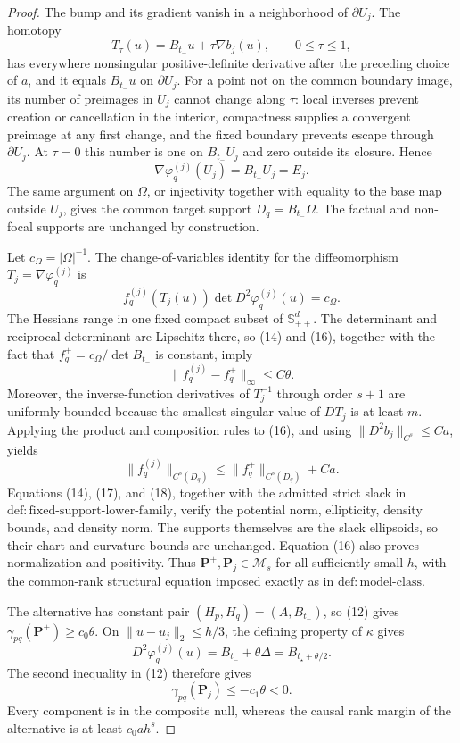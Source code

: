 \documentclass{article}
\begin{document}
\begin{proof}
The bump and its gradient vanish in a neighborhood of \(\partial U_j\).  The homotopy
\[
 T_\tau(u)=B_{t_-}u+\tau\nabla b_j(u),
 \qquad 0\le\tau\le1,
\]
has everywhere nonsingular positive-definite derivative after the preceding choice of \(a\), and it equals \(B_{t_-}u\) on \(\partial U_j\).  For a point not on the common boundary image, its number of preimages in \(U_j\) cannot change along \(\tau\): local inverses prevent creation or cancellation in the interior, compactness supplies a convergent preimage at any first change, and the fixed boundary prevents escape through \(\partial U_j\).  At \(\tau=0\) this number is one on \(B_{t_-}U_j\) and zero outside its closure.  Hence
\[
 \nabla\varphi_q^{(j)}(U_j)=B_{t_-}U_j=E_j.
 \tag{15}
\]
The same argument on \(\Omega\), or injectivity together with equality to the base map outside \(U_j\), gives the common target support \(D_q=B_{t_-}\Omega\).  The factual and non-focal supports are unchanged by construction.

Let \(c_\Omega=\lvert\Omega\rvert^{-1}\).  The change-of-variables identity for the diffeomorphism \(T_j=\nabla\varphi_q^{(j)}\) is
\[
 f_q^{(j)}(T_j(u))\det D^2\varphi_q^{(j)}(u)=c_\Omega.
 \tag{16}
\]
The Hessians range in one fixed compact subset of \(\mathbb S_{++}^d\).  The determinant and reciprocal determinant are Lipschitz there, so (14) and (16), together with the fact that \(f_q^+=c_\Omega/\det B_{t_-}\) is constant, imply
\[
 \lVert f_q^{(j)}-f_q^+\rVert_\infty\le C\theta.
 \tag{17}
\]
Moreover, the inverse-function derivatives of \(T_j^{-1}\) through order \(s+1\) are uniformly bounded because the smallest singular value of \(DT_j\) is at least \(m\).  Applying the product and composition rules to (16), and using \(\lVert D^2b_j\rVert_{C^s}\le Ca\), yields
\[
 \lVert f_q^{(j)}\rVert_{C^s(D_q)}
 \le\lVert f_q^+\rVert_{C^s(D_q)}+Ca.
 \tag{18}
\]
Equations (14), (17), and (18), together with the admitted strict slack in \(\mathrm{def:fixed\text{-}support\text{-}lower\text{-}family}\), verify the potential norm, ellipticity, density bounds, and density norm.  The supports themselves are the slack ellipsoids, so their chart and curvature bounds are unchanged.  Equation (16) also proves normalization and positivity.  Thus \(\mathbf P^+,\mathbf P_j\in\mathcal M_s\) for all sufficiently small \(h\), with the common-rank structural equation imposed exactly as in \(\mathrm{def:model\text{-}class}\).

The alternative has constant pair \((H_p,H_q)=(A,B_{t_-})\), so (12) gives \(\gamma_{pq}(\mathbf P^+)\ge c_0\theta\).  On \(\lVert u-u_j\rVert_2\le h/3\), the defining property of \(\kappa\) gives
\[
 D^2\varphi_q^{(j)}(u)=B_{t_-}+\theta\Delta
 =B_{t_\star+\theta/2}.
\]
The second inequality in (12) therefore gives
\[
 \gamma_{pq}(\mathbf P_j)\le-c_1\theta<0.
 \tag{19}
\]
Every component is in the composite null, whereas the causal rank margin of the alternative is at least \(c_0ah^s\).


\end{proof}
\end{document}
